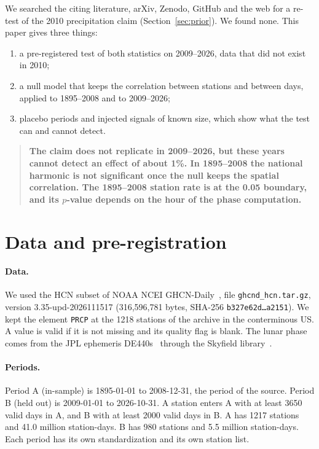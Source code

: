 \documentclass[11pt]{article}
\begin{document}
We searched the citing literature, arXiv, Zenodo, GitHub and the web for a re-test of the 2010 precipitation claim (Section~\ref{sec:prior}). We found none. This paper gives three things:
\begin{enumerate}
\item a pre-registered test of both statistics on 2009--2026, data that did not exist in 2010;
\item a null model that keeps the correlation between stations and between days, applied to 1895--2008 and to 2009--2026;
\item placebo periods and injected signals of known size, which show what the test can and cannot detect.
\end{enumerate}

\begin{quote}
\textbf{The claim does not replicate in 2009--2026, but these years cannot detect an effect of about 1\%. In 1895--2008 the national harmonic is not significant once the null keeps the spatial correlation. The 1895--2008 station rate is at the 0.05 boundary, and its $p$-value depends on the hour of the phase computation.}
\end{quote}

\section{Data and pre-registration}
\paragraph{Data.} We used the HCN subset of NOAA NCEI GHCN-Daily~\cite{menne2012}, file \texttt{ghcnd\_hcn.tar.gz}, version 3.35-upd-2026111517 (316,596,781 bytes, SHA-256 \texttt{b327e62d\dots a2151}). We kept the element \texttt{PRCP} at the 1218 stations of the archive in the conterminous US. A value is valid if it is not missing and its quality flag is blank. The lunar phase comes from the JPL ephemeris DE440s~\cite{park2021} through the Skyfield library~\cite{skyfield}.

\paragraph{Periods.} Period A (in-sample) is 1895-01-01 to 2008-12-31, the period of the source. Period B (held out) is 2009-01-01 to 2026-10-31. A station enters A with at least 3650 valid days in A, and B with at least 2000 valid days in B. A has 1217 stations and 41.0 million station-days. B has 980 stations and 5.5 million station-days. Each period has its own standardization and its own station list.
\end{document}

